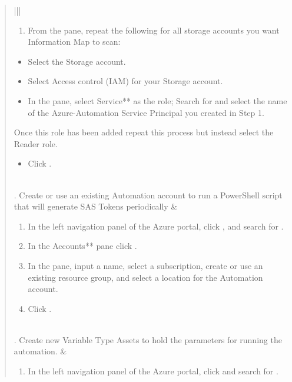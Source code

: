 \documentclass[letterpaper,10pt,english]{sphinxmanual}
\begin{document}
\begin{quote}
\begin{savenotes}
\begin{tabular}[t]{|*{2}{|}}
\begin{enumerate}
\item {} 
From the  pane, repeat the
following for all storage accounts you want Information
Map to scan:

\end{enumerate}
\begin{itemize}
\item {} 
Select the Storage account.

\item {} 
Select Access control (IAM) for your Storage account.

\item {} 
In the   pane, select 
   Service** as the role;
Search for and select the name of the Azure-Automation
Service Principal you created in Step 1.

\end{itemize}

Once this role has been added repeat this process
but instead select the Reader role.
\begin{itemize}
\item {} 
Click .

\end{itemize}
\\
. Create or use an existing Automation
account to run a PowerShell script that
will generate SAS Tokens periodically
&\begin{enumerate}
\item {} 
In the left navigation panel of the Azure portal,
click  , and search for
 .

\item {} 
In the  Accounts** pane click .

\item {} 
In the    pane,
input a name, select a subscription, create
or use an existing resource group, and
select a location for the Automation account.

\item {} 
Click .

\end{enumerate}
\\
. Create new Variable Type Assets to
hold the parameters for running the
automation.
&\begin{enumerate}
\item {} 
In the left navigation panel of the Azure portal,
click   and search for
 .


\end{enumerate}
\end{tabular}
\end{savenotes}
\end{quote}
\end{document}
